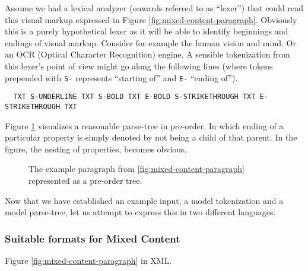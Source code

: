 \documentclass{scrreprt}
\begin{document}
Assume we had a lexical analyzer (onwards referred to as ``lexer'') that could read this visual markup expressed in Figure \ref{fig:mixed-content-paragraph}. Obviously this is a purely hypothetical lexer as it will be able to identify beginnings and endings of visual markup. Consider for example the human vision and mind. Or an OCR (Optical Character Recognition) engine. A sensible tokenization from this lexer's point of view might go along the following lines (where tokens prepended with \texttt{S-} represents ``starting of'' and \texttt{E-} ``ending of'').




\begin{lstlisting}
  TXT S-UNDERLINE TXT S-BOLD TXT E-BOLD S-STRIKETHROUGH TXT E-STRIKETHROUGH TXT
\end{lstlisting}



Figure \ref{fig:mixed-content-tree} visualizes a reasonable parse-tree in pre-order. In which ending of a particular property is simply denoted by not being a child of that parent. In the figure, the nesting of properties, becomes obvious.
  



\begin{figure}[h]
  \centering

  \caption{The example paragraph from \ref{fig:mixed-content-paragraph} represented as a pre-order tree.}
  \label{fig:mixed-content-tree}
\end{figure}



Now that we have established an example input, a model tokenization and a model parse-tree, let us attempt to express this in two different languages.



\subsubsection{Suitable formats for Mixed Content}
Figure \ref{fig:mixed-content-paragraph} in XML.
\end{document}
